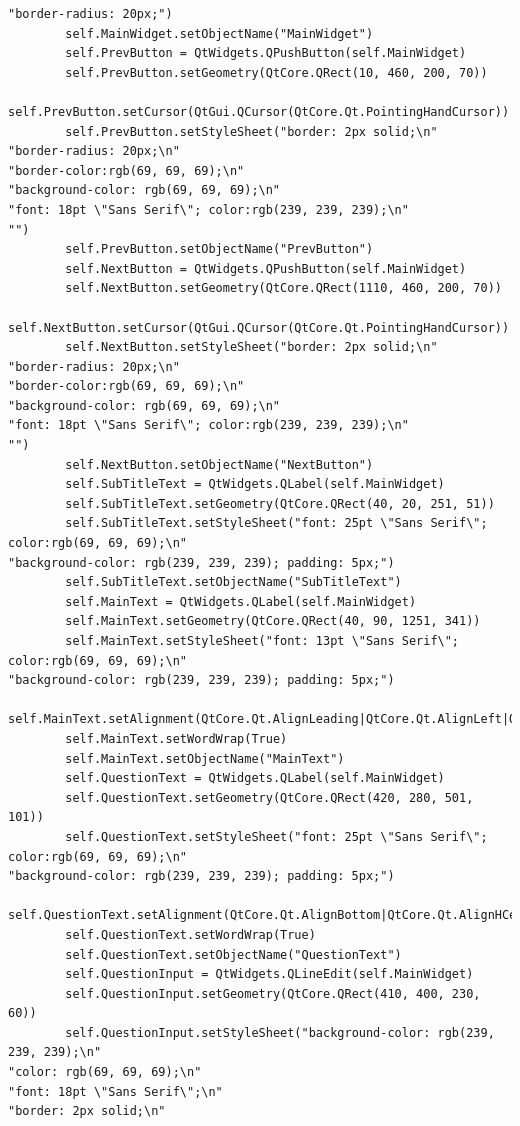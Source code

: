 \documentclass{article}
\begin{document}
\begin{lstlisting}
"border-radius: 20px;")
        self.MainWidget.setObjectName("MainWidget")
        self.PrevButton = QtWidgets.QPushButton(self.MainWidget)
        self.PrevButton.setGeometry(QtCore.QRect(10, 460, 200, 70))
        self.PrevButton.setCursor(QtGui.QCursor(QtCore.Qt.PointingHandCursor))
        self.PrevButton.setStyleSheet("border: 2px solid;\n"
"border-radius: 20px;\n"
"border-color:rgb(69, 69, 69);\n"
"background-color: rgb(69, 69, 69);\n"
"font: 18pt \"Sans Serif\"; color:rgb(239, 239, 239);\n"
"")
        self.PrevButton.setObjectName("PrevButton")
        self.NextButton = QtWidgets.QPushButton(self.MainWidget)
        self.NextButton.setGeometry(QtCore.QRect(1110, 460, 200, 70))
        self.NextButton.setCursor(QtGui.QCursor(QtCore.Qt.PointingHandCursor))
        self.NextButton.setStyleSheet("border: 2px solid;\n"
"border-radius: 20px;\n"
"border-color:rgb(69, 69, 69);\n"
"background-color: rgb(69, 69, 69);\n"
"font: 18pt \"Sans Serif\"; color:rgb(239, 239, 239);\n"
"")
        self.NextButton.setObjectName("NextButton")
        self.SubTitleText = QtWidgets.QLabel(self.MainWidget)
        self.SubTitleText.setGeometry(QtCore.QRect(40, 20, 251, 51))
        self.SubTitleText.setStyleSheet("font: 25pt \"Sans Serif\"; color:rgb(69, 69, 69);\n"
"background-color: rgb(239, 239, 239); padding: 5px;")
        self.SubTitleText.setObjectName("SubTitleText")
        self.MainText = QtWidgets.QLabel(self.MainWidget)
        self.MainText.setGeometry(QtCore.QRect(40, 90, 1251, 341))
        self.MainText.setStyleSheet("font: 13pt \"Sans Serif\"; color:rgb(69, 69, 69);\n"
"background-color: rgb(239, 239, 239); padding: 5px;")
        self.MainText.setAlignment(QtCore.Qt.AlignLeading|QtCore.Qt.AlignLeft|QtCore.Qt.AlignTop)
        self.MainText.setWordWrap(True)
        self.MainText.setObjectName("MainText")
        self.QuestionText = QtWidgets.QLabel(self.MainWidget)
        self.QuestionText.setGeometry(QtCore.QRect(420, 280, 501, 101))
        self.QuestionText.setStyleSheet("font: 25pt \"Sans Serif\"; color:rgb(69, 69, 69);\n"
"background-color: rgb(239, 239, 239); padding: 5px;")
        self.QuestionText.setAlignment(QtCore.Qt.AlignBottom|QtCore.Qt.AlignHCenter)
        self.QuestionText.setWordWrap(True)
        self.QuestionText.setObjectName("QuestionText")
        self.QuestionInput = QtWidgets.QLineEdit(self.MainWidget)
        self.QuestionInput.setGeometry(QtCore.QRect(410, 400, 230, 60))
        self.QuestionInput.setStyleSheet("background-color: rgb(239, 239, 239);\n"
"color: rgb(69, 69, 69);\n"
"font: 18pt \"Sans Serif\";\n"
"border: 2px solid;\n"

\end{lstlisting}
\end{document}

